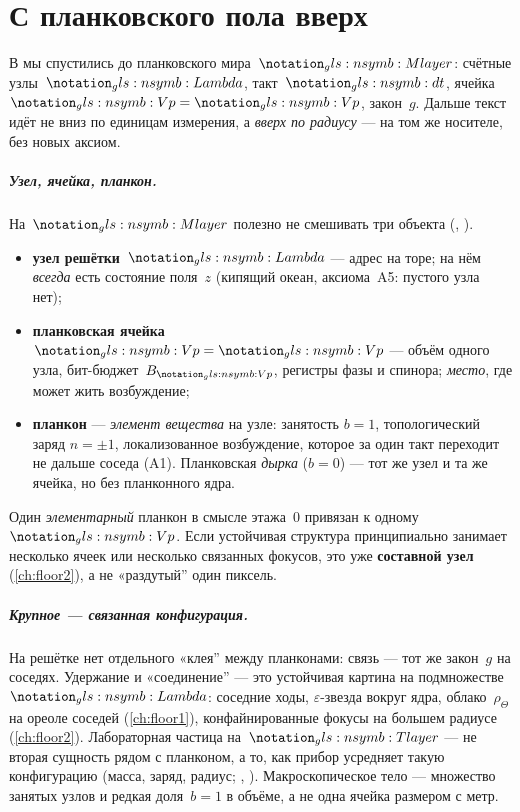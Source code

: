 \chapter{С планковского пола вверх}
\label{ch:floors-preface}

В  мы спустились до планковского мира~$\Mlayer$:
счётные узлы~$\carrierLattice$, такт~$\htick$, ячейка~$\hv=\PlanckCell$, закон~$g$.
Дальше текст идёт не вниз по единицам измерения, а \emph{вверх по радиусу} ---
на том же носителе, без новых аксиом.

\paragraph{Узел, ячейка, планкон.}
\label{para:floors-three-carriers}
На~$\Mlayer$ полезно не смешивать три объекта (, ).
\begin{itemize}[noitemsep]
\item \textbf{узел решётки}~$\carrierLattice$ --- адрес на торе; на нём \emph{всегда} есть состояние поля~$z$
  (кипящий океан, аксиома~A5: пустого узла нет);
\item \textbf{планковская ячейка}~$\hv=\PlanckCell$ --- объём одного узла, бит-бюджет~$B_{\hv}$,
  регистры фазы и спинора; \emph{место}, где может жить возбуждение;
\item \textbf{планкон} --- \emph{элемент вещества} на узле: занятость $b=1$, топологический заряд $n=\pm1$,
  локализованное возбуждение, которое за один такт переходит не дальше соседа (A1).
  Планковская \emph{дырка} ($b=0$) --- тот же узел и та же ячейка, но без планконного ядра.
\end{itemize}
Один \emph{элементарный} планкон в смысле этажа~0 привязан к одному~$\hv$.
Если устойчивая структура принципиально занимает несколько ячеек или несколько связанных фокусов,
это уже \textbf{составной узел} (\cref{ch:floor2}), а не «раздутый'' один пиксель.

\paragraph{Крупное --- связанная конфигурация.}
\label{para:floors-composite-ladder}
На решётке нет отдельного «клея'' между планконами: связь --- тот же закон~$g$ на соседях.
Удержание и «соединение'' --- это устойчивая картина на подмножестве~$\carrierLattice$:
соседние ходы, $\varepsilon$-звезда вокруг ядра, облако~$\rho_\Theta$ на ореоле соседей
(\cref{ch:floor1}), конфайнированные фокусы на большем радиусе (\cref{ch:floor2}).
Лабораторная частица на~$\layerMacro$ --- не вторая сущность рядом с планконом, а то, как прибор
усредняет такую конфигурацию (масса, заряд, радиус; , ).
Макроскопическое тело --- множество занятых узлов и редкая доля~$b=1$ в объёме, а не одна ячейка размером с метр.

